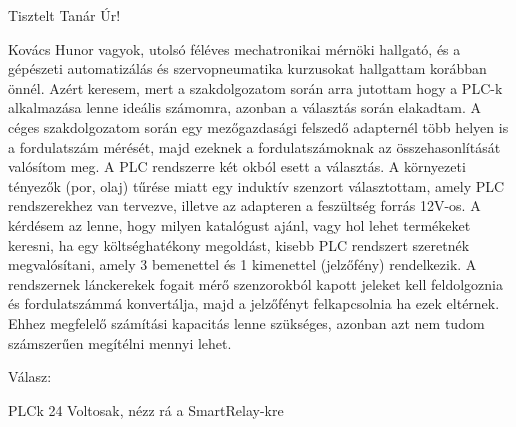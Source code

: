 \documentclass{article}
\begin{document}
	Tisztelt Tanár Úr!
	
	Kovács Hunor vagyok, utolsó féléves mechatronikai mérnöki hallgató, és a gépészeti automatizálás és szervopneumatika kurzusokat hallgattam korábban önnél. Azért keresem, mert a szakdolgozatom során arra jutottam hogy a PLC-k alkalmazása lenne ideális számomra, azonban a választás során elakadtam.
	A céges szakdolgozatom során egy mezőgazdasági felszedő adapternél több helyen is a fordulatszám mérését, majd ezeknek a fordulatszámoknak az összehasonlítását valósítom meg. A PLC rendszerre két okból esett a választás. A környezeti tényezők (por, olaj) tűrése miatt egy induktív szenzort választottam, amely PLC rendszerekhez van tervezve, illetve az adapteren a feszültség forrás 12V-os.
	A kérdésem az lenne, hogy milyen katalógust ajánl, vagy hol lehet termékeket keresni, ha egy költséghatékony megoldást, kisebb PLC rendszert szeretnék megvalósítani, amely 3 bemenettel és 1 kimenettel (jelzőfény) rendelkezik. 
	A rendszernek lánckerekek fogait mérő szenzorokból kapott jeleket kell feldolgoznia és fordulatszámmá konvertálja, majd a jelzőfényt felkapcsolnia ha ezek eltérnek. Ehhez megfelelő számítási kapacitás lenne szükséges, azonban azt nem tudom számszerűen megítélni mennyi lehet.


	Válasz:
	
	PLCk 24 Voltosak, nézz rá a SmartRelay-kre
	
\end{document}
